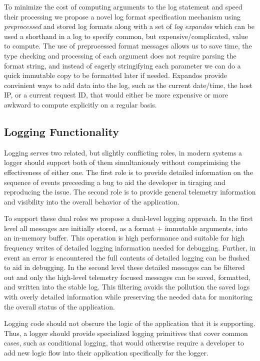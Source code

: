 To minimize the cost of computing arguments to the log statement and speed their 
processing we propose a novel log format specification mechanism using 
\emph{preprocessed} and stored log formats along with a set of \emph{log expandos} 
which can be used a shorthand in a log to specify common, but expensive/complicated, 
value to compute. The use of preprocessed format messages allows us to save time, 
the type checking and processing of each argument does not require parsing the 
format string, and instead of eagerly stringifying each parameter we can do a quick 
immutable copy to be formatted later if needed. Expandos provide convinient 
ways to add data into the log, such as the current date/time, the host IP, or a 
current request ID, that would either be more expensive or more awkward to compute 
explicitly on a regular basis.

\subsection{Logging Functionality}
\label{subsec:functionalitydesign}
\begin{design}
Logging serves two related, but slightly conflicting roles, in modern systems 
a logger should support both of them simultaniously without comprimising the 
effectiveness of either one. The first role is to provide detailed information 
on the sequence of events preceeding a bug to aid the developer in tiraging and 
reproducing the issue. The second role is to provide general telemetry 
information and visibility into the overall behavior of the application. 
\end{design}

To support these dual roles we propose a dual-level logging approach. In the 
first level all messages are initially stored, as a format + immutable 
arguments, into an in-memory buffer. This operation is high performance and 
suitable for high frequency writes of detailed logging information needed for 
debugging. Further, in event an error is encountered the full contents of 
detailed logging can be flushed to aid in debugging. In the second level these 
detailed messages can be filtered out and only the high-level telemetry focused 
messages can be saved, formatted, and written into the stable log. This filtering 
avoids the pollution the saved logs with overly detailed information while 
preserving the needed data for monitoring the overall status of the application. 

\begin{design}
Logging code should not obscure the logic of the application that it is 
supporting. Thus, a logger should provide specialized logging primitives 
that cover common cases, such as conditional logging, that would otherwise 
require a developer to add new logic flow into their application specifically 
for the logger.
\end{design}

